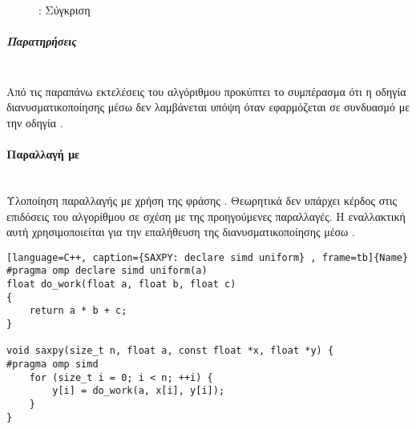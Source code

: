 \begin{figure}[h]
\begin{center}
\resizebox{0.5\textwidth}{!} {
}%
\caption{: Σύγκριση }
\end{center}
\end{figure}
\subparagraph{Παρατηρήσεις}
\ \\
Από τις παραπάνω εκτελέσεις του αλγόριθμου προκύπτει το συμπέρασμα ότι η οδηγία διανυσματικοποίησης μέσω  δεν λαμβάνεται υπόψη όταν εφαρμόζεται σε συνδυασμό με την οδηγία .


\clearpage
\paragraph{Παραλλαγή με \emph{}}
\ \\
Υλοποίηση παραλλαγής με χρήση της φράσης \emph{}. Θεωρητικά δεν υπάρχει κέρδος στις επιδόσεις του αλγορίθμου σε σχέση με της προηγούμενες παραλλαγές. Η εναλλακτική αυτή χρησιμοποιείται για την επαλήθευση της διανυσματικοποίησης μέσω \emph{}.
\begin{spacing}{0.9}
\begin{lstlisting}[language=C++, caption={SAXPY: declare simd uniform} , frame=tb]{Name}
#pragma omp declare simd uniform(a)
float do_work(float a, float b, float c)
{
    return a * b + c;
}

void saxpy(size_t n, float a, const float *x, float *y) {
#pragma omp simd
    for (size_t i = 0; i < n; ++i) {
        y[i] = do_work(a, x[i], y[i]);
    }
}
\end{lstlisting}
\end{spacing}

